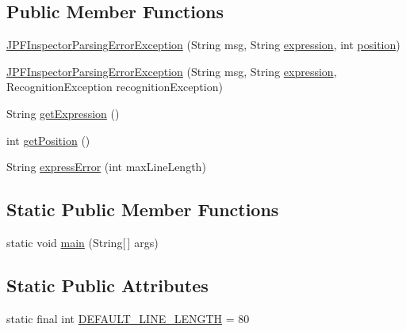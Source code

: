 \subsection*{Public Member Functions}
\begin{DoxyCompactItemize}
\item 
\hyperlink{classgov_1_1nasa_1_1jpf_1_1inspector_1_1exceptions_1_1_j_p_f_inspector_parsing_error_exception_a1292934c23ecc0e668a0938d022c8bb4}{J\+P\+F\+Inspector\+Parsing\+Error\+Exception} (String msg, String \hyperlink{classgov_1_1nasa_1_1jpf_1_1inspector_1_1exceptions_1_1_j_p_f_inspector_parsing_error_exception_a534770d46b21ef3066d07b739e2340cd}{expression}, int \hyperlink{classgov_1_1nasa_1_1jpf_1_1inspector_1_1exceptions_1_1_j_p_f_inspector_parsing_error_exception_a3b5ad5d782659c6bbe1387f4a06531bf}{position})
\item 
\hyperlink{classgov_1_1nasa_1_1jpf_1_1inspector_1_1exceptions_1_1_j_p_f_inspector_parsing_error_exception_a6539713f1f1cd6d35b7eca6426c3c679}{J\+P\+F\+Inspector\+Parsing\+Error\+Exception} (String msg, String \hyperlink{classgov_1_1nasa_1_1jpf_1_1inspector_1_1exceptions_1_1_j_p_f_inspector_parsing_error_exception_a534770d46b21ef3066d07b739e2340cd}{expression}, Recognition\+Exception recognition\+Exception)
\item 
String \hyperlink{classgov_1_1nasa_1_1jpf_1_1inspector_1_1exceptions_1_1_j_p_f_inspector_parsing_error_exception_a0eefde735ab0bb7ecba0c1ef6a095eec}{get\+Expression} ()
\item 
int \hyperlink{classgov_1_1nasa_1_1jpf_1_1inspector_1_1exceptions_1_1_j_p_f_inspector_parsing_error_exception_a6761b6729b6849f06993eecb22b88312}{get\+Position} ()
\item 
String \hyperlink{classgov_1_1nasa_1_1jpf_1_1inspector_1_1exceptions_1_1_j_p_f_inspector_parsing_error_exception_a7b3dac1dc7e21cec0c12086197ad22a0}{express\+Error} (int max\+Line\+Length)
\end{DoxyCompactItemize}
\subsection*{Static Public Member Functions}
\begin{DoxyCompactItemize}
\item 
static void \hyperlink{classgov_1_1nasa_1_1jpf_1_1inspector_1_1exceptions_1_1_j_p_f_inspector_parsing_error_exception_a9bc9dd20176c0b119131764f474509b9}{main} (String\mbox{[}$\,$\mbox{]} args)
\end{DoxyCompactItemize}
\subsection*{Static Public Attributes}
\begin{DoxyCompactItemize}
\item 
static final int \hyperlink{classgov_1_1nasa_1_1jpf_1_1inspector_1_1exceptions_1_1_j_p_f_inspector_parsing_error_exception_ae8f40fe3cd2ba83f5d6e200697c2a663}{D\+E\+F\+A\+U\+L\+T\+\_\+\+L\+I\+N\+E\+\_\+\+L\+E\+N\+G\+TH} = 80
\end{DoxyCompactItemize}
